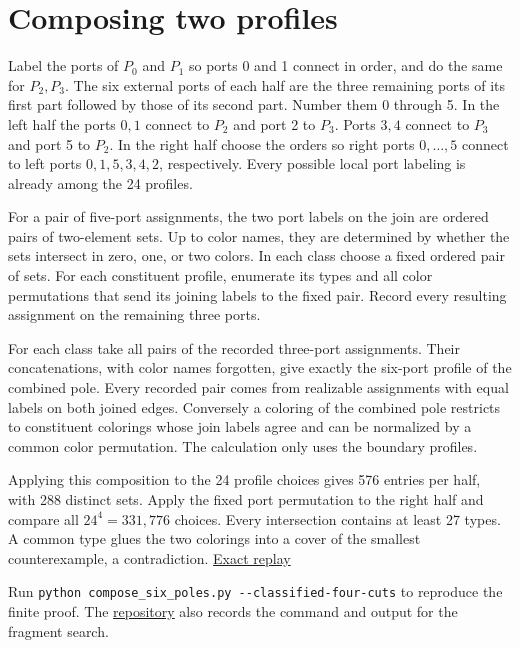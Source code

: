 \documentclass[10pt]{article}
\begin{document}
\section{Composing two profiles}

Label the ports of $P_0$ and $P_1$ so ports 0 and 1 connect in order, and do the same for $P_2,P_3$. The six external ports of each half are the three remaining ports of its first part followed by those of its second part. Number them 0 through 5. In the left half the ports $0,1$ connect to $P_2$ and port 2 to $P_3$. Ports $3,4$ connect to $P_3$ and port 5 to $P_2$. In the right half choose the orders so right ports $0,\ldots,5$ connect to left ports $0,1,5,3,4,2$, respectively. Every possible local port labeling is already among the 24 profiles.

For a pair of five-port assignments, the two port labels on the join are ordered pairs of two-element sets. Up to color names, they are determined by whether the sets intersect in zero, one, or two colors. In each class choose a fixed ordered pair of sets. For each constituent profile, enumerate its types and all color permutations that send its joining labels to the fixed pair. Record every resulting assignment on the remaining three ports.

For each class take all pairs of the recorded three-port assignments. Their concatenations, with color names forgotten, give exactly the six-port profile of the combined pole. Every recorded pair comes from realizable assignments with equal labels on both joined edges. Conversely a coloring of the combined pole restricts to constituent colorings whose join labels agree and can be normalized by a common color permutation. The calculation only uses the boundary profiles.

Applying this composition to the 24 profile choices gives 576 entries per half, with 288 distinct sets. Apply the fixed port permutation to the right half and compare all $24^4=331{,}776$ choices. Every intersection contains at least 27 types. A common type glues the two colorings into a cover of the smallest counterexample, a contradiction. \href{https://github.com/claude-make-no-mistakes/berge-fulkerson-counterexample-search/blob/main/four-five-poles.jsonl}{Exact replay}

\smallskip
Run \verb|python compose_six_poles.py --classified-four-cuts| to reproduce the finite proof.
The \href{https://github.com/claude-make-no-mistakes/berge-fulkerson-counterexample-search}{repository}
also records the command and output for the fragment search.
\end{document}
